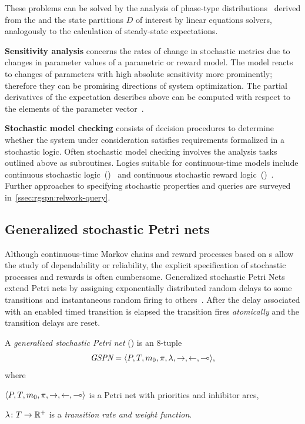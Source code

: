 These problems can be solved by the analysis of phase-type distributions~\citep{Neuts75phasetype} derived from the  and the state partitions \(D\) of interest by linear equations solvers, analogously to the calculation of steady-state expectations.

\newpara \textbf{Sensitivity analysis} concerns the rates of change in stochastic metrics due to changes in parameter values of a parametric  or reward model. The model reacts to changes of parameters with high absolute sensitivity  more prominently; therefore they can be promising directions of system optimization. The partial derivatives of the expectation describes above can be computed with respect to the elements of the parameter vector~\citep{Blake88sensitivity,Ramesh93sensitivity}.

\newpara \textbf{Stochastic model checking} consists of decision procedures to determine whether the system under consideration satisfies requirements formalized in a stochastic logic. Often stochastic model checking involves the analysis tasks outlined above as subroutines. Logics suitable for continuous-time models include continuous stochastic logic~()~\citep{Aziz96csl} and continuous stochastic reward logic~()~\citep{Kwiatkowska06csrl}. Further approaches to specifying stochastic properties and queries are surveyed in~\vref{ssec:rgspn:relwork-query}.

\subsection{Generalized stochastic Petri nets}
\label{ssec:background:gspn}

Although continuous-time Markov chains and reward processes based on s allow the study of dependability or reliability, the explicit specification of stochastic processes and rewards is often cumbersome. Generalized stochastic Petri Nets extend Petri nets by assigning exponentially distributed random delays to some transitions and instantaneous random firing to others~\citep{Marsan84gspn}. After the delay associated with an enabled timed transition is elapsed the transition fires \emph{atomically} and the transition delays are reset.

\begin{dfn}
  A \emph{generalized stochastic Petri net} () is an 8-tuple
  \begin{equation}
    \textit{GSPN} = \langle P, T, m_0, \pi, \lambda, {\rightarrow}, {\leftarrow}, {\multimap} \rangle \text,
  \end{equation}
  where
  \begin{compactitem}
  \item \(\langle P, T, m_0, \pi, {\rightarrow}, {\leftarrow}, {\multimap} \rangle\) is a Petri net with priorities and inhibitor arcs,
  \item \(\lambda\colon T \to \mathbb{R}^{+}\) is a \emph{transition rate and weight function}.
  \end{compactitem}
\end{dfn}

